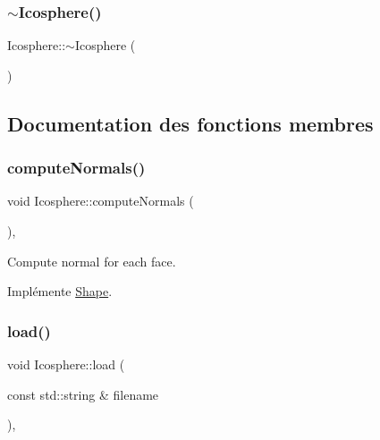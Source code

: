 \subsubsection{\texorpdfstring{$\sim$\+Icosphere()}{~Icosphere()}}
{\footnotesize\ttfamily Icosphere\+::$\sim$\+Icosphere (\begin{DoxyParamCaption}{ }\end{DoxyParamCaption})}



\subsection{Documentation des fonctions membres}
\mbox{\label{class_icosphere_af7d6c8c60248794f6a6c382dc5f98a24}} 
\subsubsection{\texorpdfstring{compute\+Normals()}{computeNormals()}}
{\footnotesize\ttfamily void Icosphere\+::compute\+Normals (\begin{DoxyParamCaption}{ }\end{DoxyParamCaption})\hspace{0.3cm}{\ttfamily [override]}, {\ttfamily [virtual]}}



Compute normal for each face. 



Implémente \hyperlink{class_shape_afd886ad433d08a566003073bfd837f40}{Shape}.

\mbox{\label{class_icosphere_a72c3cc3d95cf508a623fe336cbbab350}} 
\subsubsection{\texorpdfstring{load()}{load()}}
{\footnotesize\ttfamily void Icosphere\+::load (\begin{DoxyParamCaption}\item[{const std\+::string \&}]{filename }\end{DoxyParamCaption})\hspace{0.3cm}{\ttfamily [override]}, {\ttfamily [virtual]}}



